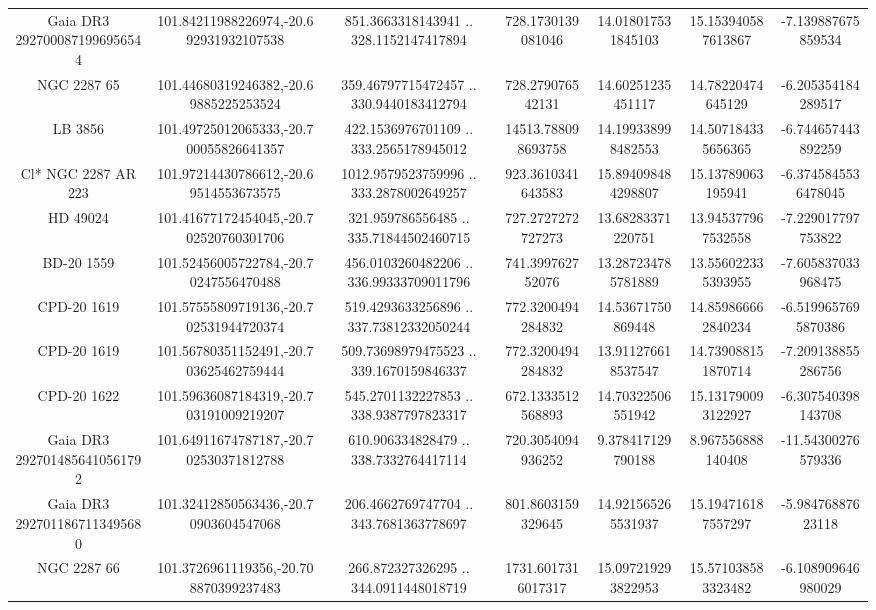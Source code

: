 \begin{table}
\begin{tabular}{ccccccc}
Gaia DR3 2927000871996956544 & 101.84211988226974,-20.692931932107538 & 851.3663318143941 .. 328.1152147417894 & 728.1730139081046 & 14.018017531845103 & 15.153940587613867 & -7.139887675859534 \\
NGC  2287    65 & 101.44680319246382,-20.69885225253524 & 359.46797715472457 .. 330.9440183412794 & 728.279076542131 & 14.60251235451117 & 14.78220474645129 & -6.205354184289517 \\
LB  3856 & 101.49725012065333,-20.700055826641357 & 422.1536976701109 .. 333.2565178945012 & 14513.788098693758 & 14.199338998482553 & 14.507184335656365 & -6.744657443892259 \\
Cl* NGC 2287     AR     223 & 101.97214430786612,-20.69514553673575 & 1012.9579523759996 .. 333.2878002649257 & 923.3610341643583 & 15.894098484298807 & 15.13789063195941 & -6.3745845536478045 \\
HD  49024 & 101.41677172454045,-20.702520760301706 & 321.959786556485 .. 335.71844502460715 & 727.2727272727273 & 13.68283371220751 & 13.945377967532558 & -7.229017797753822 \\
BD-20  1559 & 101.52456005722784,-20.70247556470488 & 456.0103260482206 .. 336.99333709011796 & 741.399762752076 & 13.287234785781889 & 13.556022335393955 & -7.605837033968475 \\
CPD-20  1619 & 101.57555809719136,-20.702531944720374 & 519.4293633256896 .. 337.73812332050244 & 772.3200494284832 & 14.53671750869448 & 14.859866662840234 & -6.5199657695870386 \\
CPD-20  1619 & 101.56780351152491,-20.703625462759444 & 509.73698979475523 .. 339.1670159846337 & 772.3200494284832 & 13.911276618537547 & 14.739088151870714 & -7.209138855286756 \\
CPD-20  1622 & 101.59636087184319,-20.703191009219207 & 545.2701132227853 .. 338.9387797823317 & 672.1333512568893 & 14.70322506551942 & 15.131790093122927 & -6.307540398143708 \\
Gaia DR3 2927014856410561792 & 101.64911674787187,-20.702530371812788 & 610.906334828479 .. 338.7332764417114 & 720.3054094936252 & 9.378417129790188 & 8.967556888140408 & -11.54300276579336 \\
Gaia DR3 2927011867113495680 & 101.32412850563436,-20.70903604547068 & 206.4662769747704 .. 343.7681363778697 & 801.8603159329645 & 14.921565265531937 & 15.194716187557297 & -5.98476887623118 \\
NGC  2287    66 & 101.3726961119356,-20.708870399237483 & 266.872327326295 .. 344.0911448018719 & 1731.6017316017317 & 15.097219293822953 & 15.571038583323482 & -6.108909646980029 \\

\end{tabular}
\end{table}
